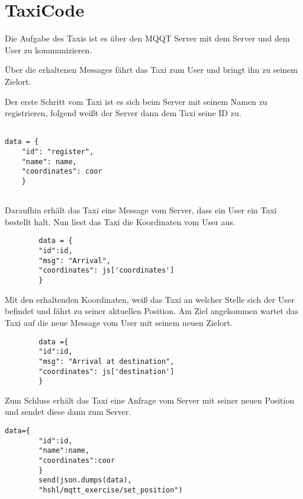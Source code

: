 \section{TaxiCode}

Die Aufgabe des Taxis ist es über den MQQT Server mit dem Server und dem User zu kommunizieren.
 
Über die erhaltenen Messages fährt das Taxi zum User und bringt ihn zu seinem Zielort.

Der erste Schritt vom Taxi ist es sich beim Server mit seinem Namen zu registrieren, folgend weißt der Server dann dem Taxi seine ID zu.

\begin{lstlisting} 

data = {
	"id": "register", 
	"name": name,
	"coordinates": coor
    }
    
\end{lstlisting}



Daraufhin erhält das Taxi eine Message vom Server, dass ein User ein Taxi bestellt halt. 
Nun liest das Taxi die Koordinaten vom User aus. 

\begin{lstlisting} 
        data = {
        "id":id,
        "msg": "Arrival",
        "coordinates": js['coordinates']
        }
\end{lstlisting}



Mit den erhaltenden Koordinaten, weiß das Taxi an welcher Stelle sich der User befindet und fährt zu seiner aktuellen Position.
Am Ziel angekommen wartet das Taxi auf die neue Message vom User mit seinem neuen Zielort.


\begin{lstlisting} 
        data ={
        "id":id,
        "msg": "Arrival at destination",
        "coordinates": js['destination']
        }
\end{lstlisting}



Zum Schluss erhält das Taxi eine Anfrage vom Server mit seiner neuen Position und sendet diese dann zum Server.

\begin{lstlisting} 
data={
        "id":id,
        "name":name,
        "coordinates":coor
        }
        send(json.dumps(data),
        "hshl/mqtt_exercise/set_position")

\end{lstlisting}
